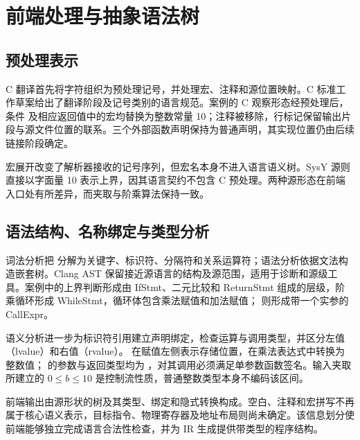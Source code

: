 \section{前端处理与抽象语法树}
\label{sec:frontend}

\subsection{预处理表示}

C 翻译首先将字符组织为预处理记号，并处理宏、注释和源位置映射。C 标准工作草案给出了翻译阶段及记号类别的语言规范\cite{wg14-n3220}。案例的 C 观察形态经预处理后，条件  及相应返回值中的宏均替换为整数常量 10；注释被移除，行标记保留输出片段与源文件位置的联系。三个外部函数声明保持为普通声明，其实现位置仍由后续链接阶段确定。

宏展开改变了解析器接收的记号序列，但宏名本身不进入语言语义树。SysY 源则直接以字面量 10 表示上界，因其语言契约不包含 C 预处理。两种源形态在前端入口处有所差异，而夹取与阶乘算法保持一致。

\subsection{语法结构、名称绑定与类型分析}

词法分析把  分解为关键字、标识符、分隔符和关系运算符；语法分析依据文法构造嵌套树。Clang AST 保留接近源语言的结构及源范围，适用于诊断和源级工具\cite{clang-ast-2026}。案例中的上界判断形成由 IfStmt、二元比较和 ReturnStmt 组成的层级，阶乘循环形成 WhileStmt，循环体包含乘法赋值和加法赋值； 则形成带一个实参的 CallExpr。

语义分析进一步为标识符引用建立声明绑定，检查运算与调用类型，并区分左值（lvalue）和右值（rvalue）。 在赋值左侧表示存储位置，在乘法表达式中转换为整数值； 的参数与返回类型均为 ，对其调用必须满足单参数函数签名。输入夹取所建立的 $0\le b\le10$ 是控制流性质，普通整数类型本身不编码该区间。

前端输出由源形状的树及其类型、绑定和隐式转换构成。空白、注释和宏拼写不再属于核心语义表示，目标指令、物理寄存器及地址布局则尚未确定。该信息划分使前端能够独立完成语言合法性检查，并为 IR 生成提供带类型的程序结构。
